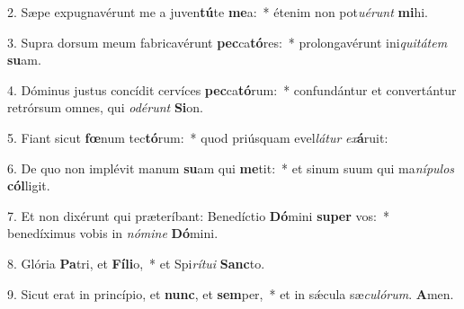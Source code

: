 2. Sæpe expugnavérunt me a juven\textbf{tú}te \textbf{me}a:~*  étenim non pot\textit{u}\textit{é}\textit{runt} \textbf{mi}hi.\

3. Supra dorsum meum fabricavérunt \textbf{pec}ca\textbf{tó}res:~*  prolongavérunt ini\textit{qui}\textit{tá}\textit{tem} \textbf{su}am.\

4. Dóminus justus concídit cervíces \textbf{pec}ca\textbf{tó}rum:~*  confundántur et convertántur retrórsum omnes, qui \textit{o}\textit{dé}\textit{runt} \textbf{Si}on.\

5. Fiant sicut \textbf{fœ}num tec\textbf{tó}rum:~*  quod priúsquam evel\textit{lá}\textit{tur} \textit{ex}\textbf{á}ruit:\

6. De quo non implévit manum \textbf{su}am qui \textbf{me}tit:~*  et sinum suum qui ma\textit{ní}\textit{pu}\textit{los} \textbf{cól}ligit.\

7. Et non dixérunt qui præteríbant: Benedíctio \textbf{Dó}mini \textbf{su}\textbf{per} vos:~*  benedíximus vobis in \textit{nó}\textit{mi}\textit{ne} \textbf{Dó}mini.\

8. Glória \textbf{Pa}tri, et \textbf{Fí}\textbf{li}o,~*  et Spi\textit{rí}\textit{tu}\textit{i} \textbf{Sanc}to.\

9. Sicut erat in princípio, et \textbf{nunc}, et \textbf{sem}per,~*  et in sǽcula sæ\textit{cu}\textit{ló}\textit{rum}. \textbf{A}men.\

